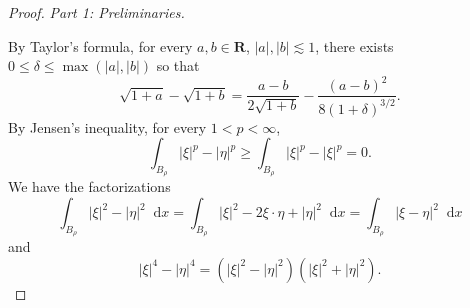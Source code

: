 \documentclass[reqno,10pt]{amsart}
\newcommand{\RR}{\mathbf{R}}
\newcommand*\dif{\mathop{}\!\mathrm{d}}
\theoremstyle{definition}
\newcommand{\proofpart}[2]{%
  \par
  \addvspace{\medskipamount}%
  \noindent\emph{Part #1: #2.}
}
\numberwithin{equation}{section}
\begin{document}
\begin{proof}
\proofpart{1}{Preliminaries}
By Taylor's formula, for every $a, b \in \RR$, $|a|, |b| \lesssim 1$, there exists $0 \leq \delta \leq \max(|a|, |b|)$ so that
\begin{equation}\label{sqrt formula}
\sqrt{1 + a} - \sqrt{1 + b} = \frac{a - b}{2\sqrt{1 + b}} - \frac{(a - b)^2}{8(1 + \delta)^{3/2}}.
\end{equation}
By Jensen's inequality, for every $1 < p < \infty$,
\begin{equation}\label{Jensen}
\int_{B_\rho} |\xi|^p - |\eta|^p \geq \int_{B_\rho} |\xi|^p - |\xi|^p = 0.
\end{equation}
We have the factorizations
\begin{equation}\label{factored average}
\int_{B_\rho} |\xi|^2 - |\eta|^2 \dif x = \int_{B_\rho} |\xi|^2 - 2\xi \cdot \eta + |\eta|^2 \dif x = \int_{B_\rho} |\xi - \eta|^2 \dif x
\end{equation}
and 
\begin{equation}\label{factor 4}
|\xi|^4 - |\eta|^4 = (|\xi|^2 - |\eta|^2)(|\xi|^2 + |\eta|^2).
\end{equation}


\end{proof}
\end{document}
